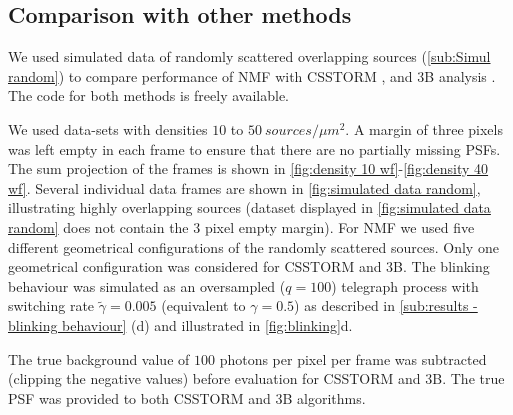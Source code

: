 
\subsection{Comparison with other methods\label{sub:results - comparison}} %
We used simulated data of randomly scattered overlapping sources (\autoref{sub:Simul random}) to compare performance of NMF with CSSTORM \cite{Zhu2012}, and 3B analysis \cite{Cox2011}. The code for both methods is freely available.  

We used data-sets with densities $10$ to $50\ \unit{sources/\mu m^{2}}$. A margin of three pixels was left empty in each frame to ensure that there are no partially missing PSFs. The sum projection of the frames is shown in \autoref{fig:density 10 wf}-\ref{fig:density 40 wf}. Several individual data frames are shown in \autoref{fig:simulated data random}, illustrating highly overlapping sources (dataset displayed in \autoref{fig:simulated data random} does not contain the 3 pixel empty margin). For NMF we used five different geometrical configurations of the randomly scattered sources. Only one geometrical configuration was considered for CSSTORM and 3B. The blinking behaviour was simulated as an oversampled ($q=100$) telegraph process with switching rate $\tilde{\gamma}=0.005$ (equivalent to $\gamma=0.5$) as described in \autoref{sub:results - blinking behaviour} (d) and illustrated in \autoref{fig:blinking}d.

The true background value of $100$ photons per pixel per frame was subtracted (clipping the negative values) before evaluation for CSSTORM and 3B. The true PSF was provided to both CSSTORM and 3B algorithms. 

